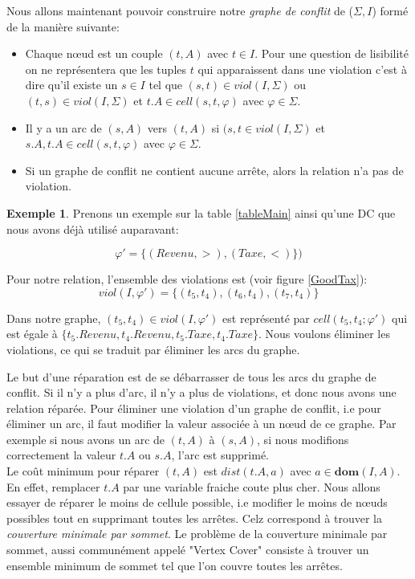 \documentclass[letterpaper, 12pt]{report}
\theoremstyle{definition}
\newtheorem{myexample}{Exemple}
\newcommand{\dom}{\mathbf{dom}}
\begin{document}
Nous allons maintenant pouvoir construire notre \emph{graphe de conflit} de ($\Sigma,I$) formé de la manière suivante:
\begin{itemize}
\item Chaque nœud est un couple $(t,A)$ avec $t\in I$. Pour une question de lisibilité on ne représentera que les tuples $t$ qui apparaissent dans une violation c'est à dire qu'il existe un $s \in I$ tel que $(s,t) \in viol(I,\Sigma)$ ou $(t,s) \in viol(I,\Sigma)$ et $t.A \in cell(s,t,\varphi)$ avec $\varphi \in \Sigma$.
\item Il y a un arc de $(s,A)$ vers $(t,A)$ si $(s,t \in viol(I,\Sigma)$ et $s.A,t.A \in cell(s,t,\varphi)$ avec $\varphi \in \Sigma$. 
\item Si un graphe de conflit ne contient aucune arrête, alors la relation n'a pas de violation.
\end{itemize}

\begin{myexample}
Prenons un exemple sur la table \ref{tableMain} ainsi qu'une DC que nous avons déjà utilisé auparavant:

$$\varphi' =\{(Revenu,>),(Taxe,<) \})$$

Pour notre relation, l'ensemble des violations est (voir figure \ref{GoodTax}):
 $$ viol(I,\varphi') = \{ (t_5,t_4),(t_6,t_4),(t_7,t_4) \}$$

Dans notre graphe, $(t_5,t_4) \in viol(I,\varphi')$ est représenté par $cell(t_5,t_4;\varphi')$ qui est égale à $\{ t_5.Revenu, t_4.Revenu, t_5.Taxe, t_4.Taxe\}$. Nous voulons éliminer les violations, ce qui se traduit par éliminer les arcs du graphe. 
\end{myexample}

Le but d'une réparation est de se débarrasser de tous les arcs du graphe de conflit. Si il n'y a plus d'arc, il n'y a plus de violations, et donc nous avons une relation réparée. Pour éliminer une violation d'un graphe de conflit, i.e pour éliminer un arc, il faut modifier la valeur associée à un nœud de ce graphe. Par exemple si nous avons un arc de $(t,A)$ à $(s,A)$, si nous modifions correctement la valeur $t.A$ ou $s.A$, l'arc est supprimé.\\

Le coût minimum pour réparer $(t,A)$ est $dist(t.A,a)$ avec $a \in \dom(I,A)$. En effet, remplacer $t.A$ par une variable fraiche coute plus cher. Nous allons essayer de réparer le moins de cellule possible, i.e modifier le moins de nœuds possibles tout en supprimant toutes les arrêtes. Celz correspond à trouver la \emph{couverture minimale par sommet}. Le problème de la couverture minimale par sommet, aussi communément appelé "Vertex Cover" consiste à trouver un ensemble minimum de sommet tel que l'on couvre toutes les arrêtes.
\end{document}
